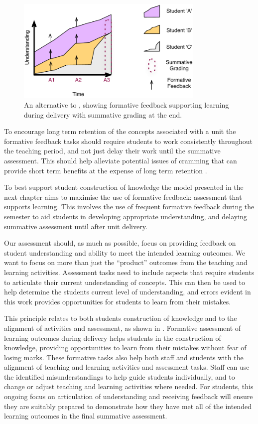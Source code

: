 \begin{figure}[htbp]
	\centering
	\includegraphics[width=0.8\textwidth]{FormativeFeedback}
	\caption{An alternative to , showing formative feedback supporting learning during delivery with summative grading at the end.}
	\label{fig:formative}
\end{figure}

To encourage long term retention of the concepts associated with a unit the formative feedback tasks should require students to work consistently throughout the teaching period, and not just delay their work until the summative assessment. This should help alleviate potential issues of cramming that can provide short term benefits at the expense of long term retention \citep{Bjork:1994}.

To best support student construction of knowledge the model presented in the next chapter aims to maximise the use of formative feedback: assessment that supports learning. This involves the use of frequent formative feedback during the semester to aid students in developing appropriate understanding, and delaying summative assessment until after unit delivery. 

Our assessment should, as much as possible, focus on providing feedback on student understanding and ability to meet the intended learning outcomes. We want to focus on more than just the ``product'' outcomes from the teaching and learning activities. Assessment tasks need to include aspects that require students to articulate their current understanding of concepts. This can then be used to help determine the students current level of understanding, and errors evident in this work provides opportunities for students to learn from their mistakes.

This principle relates to both students construction of knowledge and to the alignment of activities and assessment, as shown in . Formative assessment of learning outcomes during delivery helps students in the construction of knowledge, providing opportunities to learn from their mistakes without fear of losing marks. These formative tasks also help both staff and students with the alignment of teaching and learning activities and assessment tasks. Staff can use the identified misunderstandings to help guide students individually, and to change or adjust teaching and learning activities where needed. For students, this ongoing focus on articulation of understanding and receiving feedback will ensure they are suitably prepared to demonstrate how they have met all of the intended learning outcomes in the final summative assessment.

